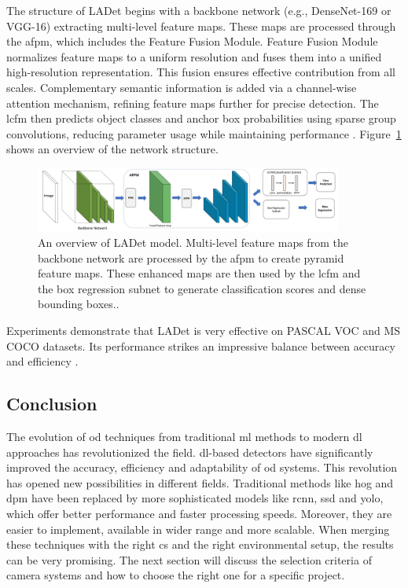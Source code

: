 \begin{enumerate}
     The structure of LADet begins with a backbone network (e.g., DenseNet-169 or VGG-16) extracting multi-level feature maps. These maps are processed through the \gls{afpm}, which includes the Feature Fusion Module. Feature Fusion Module normalizes feature maps to a uniform resolution and fuses them into a unified high-resolution representation. This fusion ensures effective contribution from all scales. Complementary semantic information is added via a channel-wise attention mechanism, refining feature maps further for precise detection. The \gls{lcfm} then predicts object classes and anchor box probabilities using sparse group convolutions, reducing parameter usage while maintaining performance \cite{LADet}. Figure~\ref{LADet} shows an overview of the network structure.

     \begin{figure}[ht]
        \centering
        \includegraphics[width=0.9\textwidth]{Figures/LADet.PNG} 
        \caption{An overview of LADet model. Multi-level feature maps from the backbone network are processed by the \gls{afpm} to create pyramid feature maps. These enhanced maps are then used by the \gls{lcfm} and the box regression subnet to generate classification scores and dense bounding boxes.\cite{LADet}.}
        \label{LADet}
    \end{figure}

     Experiments demonstrate that LADet is very effective on PASCAL VOC and MS COCO datasets. Its performance strikes an impressive balance between accuracy and efficiency \cite{LADet}.
     
\end{enumerate}

\subsection{Conclusion}
The evolution of \gls{od} techniques from traditional \gls{ml} methods to modern \gls{dl} approaches has revolutionized the field. \gls{dl}-based detectors have significantly improved the accuracy, efficiency and adaptability of \gls{od} systems. This revolution has opened new possibilities in different fields. Traditional methods like \gls{hog} and \gls{dpm} have been replaced by more sophisticated models like \gls{rcnn}, \gls{ssd} and \gls{yolo}, which offer better performance and faster processing speeds. Moreover, they are easier to implement, available in wider range and more scalable. When merging these techniques with the right \gls{cs} and the right environmental setup, the results can be very promising. The next section will discuss the selection criteria of camera systems and how to choose the right one for a specific project.

